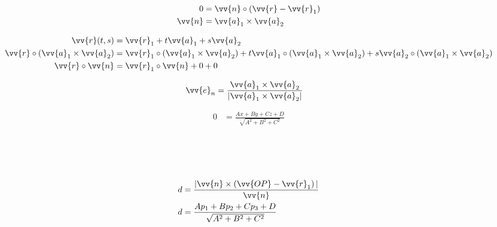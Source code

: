\begin{boxleft}
\\
\\
\end{boxleft}\begin{boxrightshaded}
\begin{align} 
0&=\vv{n}\circ\left(\vv{r}-\vv{r}_1\right)\\
\vv{n}&=\vv{a}_1\times\vv{a}_2
\end{align}\end{boxrightshaded}

\begin{boxleft}
\end{boxleft}\begin{boxrightshaded}
\begin{align} 
\vv{r}(t,s) &=\vv{r}_1+t\vv{a}_1+s\vv{a}_2\\
\vv{r}\circ(\vv{a}_1\times\vv{a}_2)&=\vv{r}_1\circ(\vv{a}_1\times\vv{a}_2)+t\vv{a}_1\circ(\vv{a}_1\times\vv{a}_2)+s\vv{a}_2\circ(\vv{a}_1\times\vv{a}_2)\\
\vv{r}\circ\vv{n}&=\vv{r}_1\circ\vv{n}+0+0
\end{align}\end{boxrightshaded}

\begin{boxleft}
\end{boxleft}\begin{boxrightshaded}
\begin{align} 
\vv{e}_n&=\frac{\vv{a}_1\times\vv{a}_2}{|\vv{a}_1\times\vv{a}_2|}
\end{align}\end{boxrightshaded}

\begin{boxleft}
\end{boxleft}\begin{boxrightshaded}
\begin{align} 
0&=\frac{Ax+By+Cz+D}{\sqrt{A^2+B^2+C^2}}
\end{align}\end{boxrightshaded}


\begin{boxleft}
\\
\\
\\
\end{boxleft}\begin{boxrightshaded}
\begin{align} 
d&=\frac{|\vv{n}\times\left(\vv{OP}-\vv{r}_1\right)|}{\vv{n}}\\
d&=\frac{Ap_1+Bp_2+Cp_3+D}{\sqrt{A^2+B^2+C^2}}
\end{align}\end{boxrightshaded}


